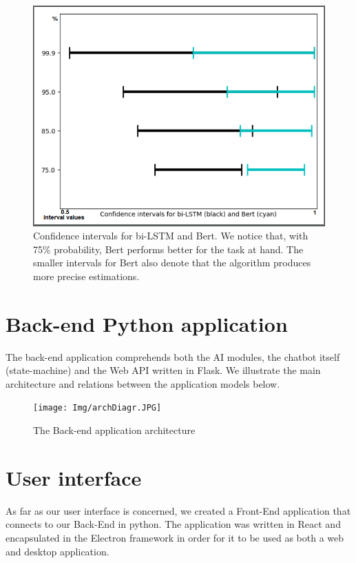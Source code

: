 \documentclass[runningheads,a4paper,11pt]{report}
\begin{document}
\begin{figure}
\centerline{\includegraphics[width=12cm]{Img/intervals.png}}  
	\caption{Confidence intervals for bi-LSTM and Bert. We notice that, with 75\% probability, Bert performs better for the task at hand. The smaller intervals for Bert also denote that the algorithm produces more precise estimations.}
	\label{interv}
\end{figure}


\section{Back-end Python application}
\label{section:BE}

The back-end application comprehends both the AI modules, the chatbot itself (state-machine) and the Web API written in Flask. We illustrate the main architecture and relations between the application models below.

\begin{figure}
\centerline{\texttt{[image: Img/archDiagr.JPG]}}  
	\caption{The Back-end application architecture}
	\label{beArch}
\end{figure}


\section{User interface}
\label{section:UI}

As far as our user interface is concerned, we created a Front-End application that connects to our Back-End in python. The application was written in React and encapsulated in the Electron framework in order for it to be used as both a web and desktop application. 
\end{document}
